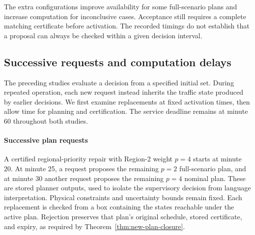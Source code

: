The extra configurations improve availability for some full-scenario
plans and increase computation for inconclusive cases. Acceptance still
requires a complete matching certificate before activation. The recorded
timings do not establish that a proposal can always be checked within a
given decision interval.

\subsection{Successive requests and computation delays}
\label{sec:sequential-handover-results}

The preceding studies evaluate a decision from a specified initial set.
During repeated operation, each new request instead inherits the traffic
state produced by earlier decisions. We first examine replacements at
fixed activation times, then allow time for planning and certification.
The service deadline remains at minute 60 throughout both studies.

\paragraph{Successive plan requests}
A certified regional-priority repair with Region-2 weight $p=4$ starts at minute 20.
At minute 25, a request proposes the remaining $p=2$ full-scenario plan,
and at minute 30 another request proposes the remaining $p=4$ nominal
plan. These are stored planner outputs, used to isolate the supervisory
decision from language interpretation. Physical constraints and uncertainty
bounds remain fixed. Each replacement is checked from a box containing
the states reachable under the active plan. Rejection preserves that
plan's original schedule, stored certificate, and expiry, as required by
Theorem~\ref{thm:new-plan-closure}.

